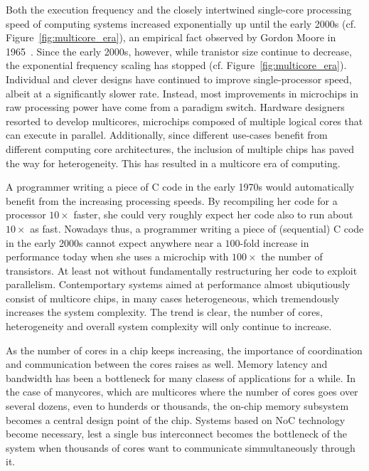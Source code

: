 Both the execution frequency and the closely intertwined single-core processing speed of computing systems increased exponentially up until the early 2000s (cf. Figure~\ref{fig:multicore_era}), an empirical fact observed by Gordon Moore in 1965~\cite{moore}.
Since the early 2000s, however, while tranistor size continue to decrease, the exponential frequency scaling has stopped (cf. Figure~\ref{fig:multicore_era}).
Individual and clever designs have continued to improve single-processor speed, albeit at a significantly slower rate.
Instead, most improvements in microchips in raw processing power have come from a paradigm switch.
Hardware designers resorted to develop multicores, microchips composed of multiple logical cores that can execute in parallel.
Additionally, since different use-cases benefit from different computing core architectures, the inclusion of multiple chips has paved the way for heterogeneity.
This has resulted in a multicore era of computing.

A programmer writing a piece of C code in the early 1970s would automatically benefit from the increasing processing speeds.
By recompiling her code for a processor $10 \times$ faster, she could very roughly expect her code also to run about $10 \times$ as fast.%
Nowadays thus, a programmer writing a piece of (sequential) C code in the early 2000s cannot expect anywhere near a $100$-fold increase in performance today when she uses a microchip with $100 \times$ the number of transistors.
At least not without fundamentally restructuring her code to exploit parallelism.
Contemportary systems aimed at performance almost ubiqutiously consist of multicore chips, in many cases heterogeneous, which tremendously increases the system complexity.
The trend is clear, the number of cores, heterogeneity and overall system complexity will only continue to increase.

As the number of cores in a chip keeps increasing, the importance of coordination and communication between the cores raises as well.
Memory latency and bandwidth has been a bottleneck for many clasess of applications for a while.
In the case of manycores, which are multicores where the number of cores goes over several dozens, even to hunderds or thousands, the on-chip memory subsystem becomes a central design point of the chip.
Systems based on \ac{NoC} technology become necessary, lest a single bus interconnect becomes the bottleneck of the system when thousands of cores want to communicate simmultaneously through it.

